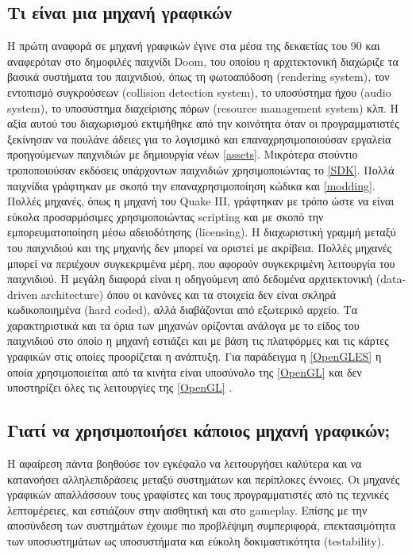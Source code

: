 	\subsection {Τι είναι μια μηχανή γραφικών}
	Η πρώτη αναφορά σε μηχανή γραφικών έγινε στα μέσα της δεκαετίας του 90 και αναφερόταν στο δημοφιλές παιχνίδι Doom, του οποίου η αρχιτεκτονική διαχώριζε τα βασικά συστήματα του παιχνιδιού, όπως τη φωτοαπόδοση (rendering system), τον εντοπισμό συγκρούσεων (collision detection system), το υποσύστημα ήχου (audio system), το υποσύστημα διαχείρισης πόρων (resource management system) κλπ. Η αξία αυτού του διαχωρισμού εκτιμήθηκε από την κοινότητα όταν οι προγραμματιστές ξεκίνησαν να πουλάνε άδειες για το λογισμικό και επαναχρησιμοποιούσαν εργαλεία προηγούμενων παιχνιδιών με δημιουργία νέων \ref{assets}. Μικρότερα στούντιο τροποποιούσαν εκδόσεις υπάρχοντων παιχνιδιών χρησιμοποιώντας το \ref{SDK}.
	Πολλά παιχνίδια γράφτηκαν με σκοπό την επαναχρησιμοποίηση κώδικα και \ref{modding}. Πολλές μηχανές, όπως η μηχανή του Quake III, γράφτηκαν με τρόπο ώστε να είναι εύκολα προσαρμόσιμες χρησιμοποιώντας scripting και με σκοπό την εμπορευματοποίηση μέσω αδειοδότησης (licensing).
	Η διαχωριστική γραμμή μεταξύ του παιχνιδιού και της μηχανής δεν μπορεί να οριστεί με ακρίβεια. Πολλές μηχανές μπορεί να περιέχουν συγκεκριμένα μέρη, που αφορούν συγκεκριμένη λειτουργία του παιχνιδιού. Η μεγάλη διαφορά είναι η οδηγούμενη από δεδομένα αρχιτεκτονική (data-driven architecture) όπου οι κανόνες και τα στοιχεία δεν είναι σκληρά κωδικοποιημένα (hard coded), αλλά διαβάζονται από εξωτερικό αρχείο.
	Τα χαρακτηριστικά και τα όρια των μηχανών ορίζονται ανάλογα με το είδος του παιχνιδιού στο οποίο η μηχανή εστιάζει και με βάση τις πλατφόρμες και τις κάρτες γραφικών στις οποίες προορίζεται η ανάπτυξη. Για παράδειγμα η \ref{OpenGLES} η οποία χρησιμοποιείται από τα κινήτα είναι υποσύνολο της \ref{OpenGL} και δεν υποστηρίζει όλες τις λειτουργίες της \ref{OpenGL} \cite{opengleslimitations}.
	
	\subsection{Γιατί να χρησιμοποιήσει κάποιος μηχανή γραφικών;}	
	Η αφαίρεση πάντα βοηθούσε τον εγκέφαλο να λειτουργήσει καλύτερα και να κατανοήσει αλληλεπιδράσεις μεταξύ συστημάτων και περίπλοκες έννοιες. Οι μηχανές γραφικών απαλλάσσουν τους γραφίστες και τους προγραμματιστές από τις τεχνικές λεπτομέρειες, και εστιάζουν στην αισθητική και στο gameplay. Επίσης με την αποσύνδεση των συστημάτων έχουμε πιο προβλέψιμη συμπεριφορά, επεκτασιμότητα των υποσυστημάτων ως υποσυστήματα και εύκολη δοκιμαστικότητα (testability).
	
